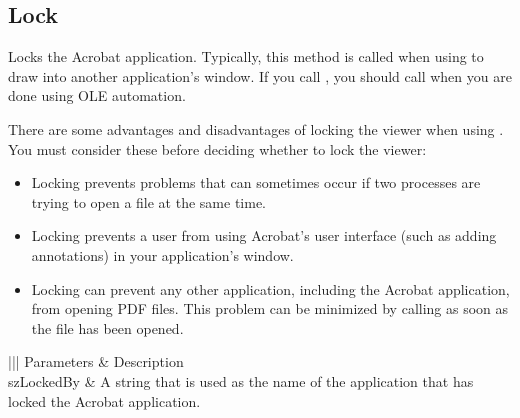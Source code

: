 \documentclass[letterpaper,12pt,english,openany,oneside]{sphinxmanual}
\begin{document}
\subsection{Lock}
\label{\detokenize{IAC_API_OLE_Objects:lock}}
Locks the Acrobat application. Typically, this method is called when using   to draw into another application’s window. If you call , you should call   when you are done using OLE automation.

There are some advantages and disadvantages of locking the viewer when using   . You must consider these before deciding whether to lock the viewer:
\begin{itemize}
\item {} 
Locking prevents problems that can sometimes occur if two processes are trying to open a file at the same time.

\item {} 
Locking prevents a user from using Acrobat’s user interface (such as adding annotations) in your application’s window.

\item {} 
Locking can prevent any other application, including the Acrobat application, from opening PDF files. This problem can be minimized by calling   as soon as the file has been opened.

\end{itemize}


\begin{sphinxVerbatim}[commandchars=\\\{\}]
  
\end{sphinxVerbatim}
\label{\detokenize{IAC_API_OLE_Objects:parameters-4}}


\begin{savenotes}\sphinxattablestart
\centering
{}\label{\detokenize{IAC_API_OLE_Objects:section-6}}\nobreak
\begin{tabular}[t]{|||}
\hline
\sphinxstyletheadfamily 
Parameters
&\sphinxstyletheadfamily 
Description
\\
\hline
szLockedBy
&
A string that is used as the name of the application that has locked the Acrobat application.
\\
\hline
\end{tabular}
\par
\sphinxattableend\end{savenotes}
\end{document}
